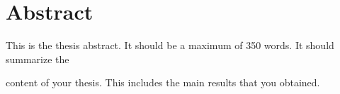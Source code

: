 \thispagestyle{empty}
\section*{Abstract}

\begin{doublespace}
This is the thesis abstract. It should be a maximum of 350 words. It should summarize the


content of your thesis. This includes the main results that
you obtained. 
\end{doublespace}

